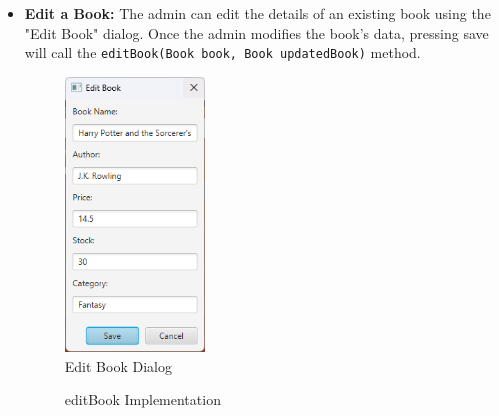 \documentclass[a4paper,14pt]{extarticle}
\begin{document}
\begin{itemize}
\begin{figure}[H]
    \end{figure}
\newpage
    \item \textbf{Edit a Book:} The admin can edit the details of an existing book using the "Edit Book" dialog. Once the admin modifies the book's data, pressing save will call the 
    \texttt{edit\-Book(Book book, Book updated\-Book)} method.
    \begin{figure}[H]
        \centering
        \includegraphics[width=0.35\textwidth]{Media/Edit Book.png}
        \caption{Edit Book Dialog}
    \end{figure}

    \begin{figure}[H]
    \centering
        \caption{editBook Implementation}
\end{figure}


\end{itemize}
\end{document}
